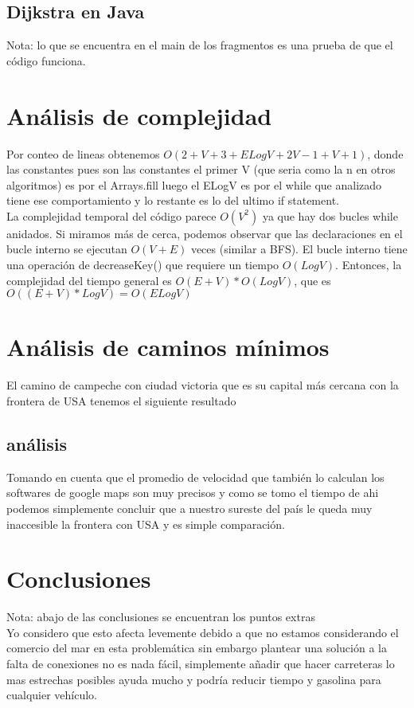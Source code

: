 \documentclass{article}
\begin{document}
\subsection*{Dijkstra en Java}
Nota: lo que se encuentra en el main de los fragmentos es una prueba de que el código funciona. 

\section{Análisis de complejidad}
Por conteo de lineas obtenemos $O(2+V+3+ELogV+2V-1+V+1)$, donde las constantes pues son las constantes
el primer V (que seria como la n en otros algoritmos) es por el Arrays.fill
luego el ELogV es por el while que analizado tiene ese comportamiento y lo restante es lo del ultimo if statement. \\
La complejidad temporal del código parece $O(V^2)$
ya que hay dos bucles while anidados. Si miramos más de cerca,
podemos observar que las declaraciones en el bucle interno se ejecutan $O(V+E)$
veces (similar a BFS). El bucle interno tiene una operación de 
 decreaseKey() que requiere un tiempo $O(LogV)$.
 Entonces, la complejidad del tiempo general es $O(E+V)*O(LogV)$, que es $O((E+V)*LogV) = O(ELogV)$
\section{Análisis de caminos mínimos}
El camino de campeche con ciudad victoria que es su capital más cercana con la frontera de USA tenemos el siguiente resultado
\subsection*{análisis}
Tomando en cuenta que el promedio de velocidad que también lo calculan los softwares
de google maps son muy precisos y como se tomo el tiempo de ahi podemos simplemente concluir que 
a nuestro sureste del país le queda muy inaccesible la frontera con USA y es simple comparación. 

\section{Conclusiones}\label{Conclusiones}				%
Nota: abajo de las conclusiones se encuentran los puntos extras
\\
Yo considero que esto afecta levemente debido a que no estamos considerando el comercio del mar 
en esta problemática sin embargo plantear una solución a la falta de conexiones no es nada fácil,
simplemente añadir que hacer carreteras lo mas estrechas posibles ayuda mucho y podría reducir tiempo 
y gasolina para cualquier vehículo.
\end{document}
